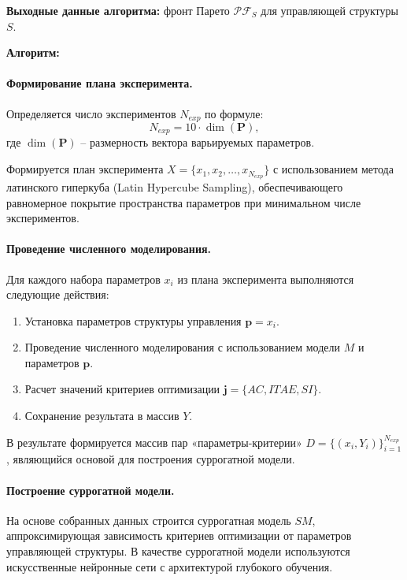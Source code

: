 \textbf{Выходные данные алгоритма:} фронт Парето $\mathcal{PF}_{S}$ для управляющей структуры $S$.

\textbf{Алгоритм:}

\paragraph*{Формирование плана эксперимента.}

Определяется число экспериментов $N_{exp}$ по формуле:
\begin{equation}
    N_{exp} = 10 \cdot \dim(\mathbf{P}),
\end{equation}
где $\dim(\mathbf{P})$ -- размерность вектора варьируемых параметров.

Формируется план эксперимента $X = \{x_1, x_2, \ldots, x_{N_{exp}}\}$ с использованием метода латинского
гиперкуба (Latin Hypercube Sampling), обеспечивающего равномерное покрытие пространства параметров при минимальном числе экспериментов.

\paragraph*{Проведение численного моделирования.}

Для каждого набора параметров $x_i$ из плана эксперимента выполняются следующие действия:
\begin{enumerate}
    \item Установка параметров структуры управления $\mathbf{p} = x_i$.
    \item Проведение численного моделирования с использованием модели $M$ и параметров $\mathbf{p}$.
    \item Расчет значений критериев оптимизации $\mathbf{j} = \{AC, ITAE, SI\}$.
    \item Сохранение результата в массив $Y$.
\end{enumerate}

В результате формируется массив пар «параметры-критерии» $D = \{(x_i, Y_i)\}_{i=1}^{N_{exp}}$,
являющийся основой для построения суррогатной модели.

\paragraph*{Построение суррогатной модели.}

На основе собранных данных строится суррогатная модель $SM$, аппроксимирующая зависимость критериев
оптимизации от параметров управляющей структуры. В качестве суррогатной модели
используются искусственные нейронные сети с архитектурой глубокого обучения.

